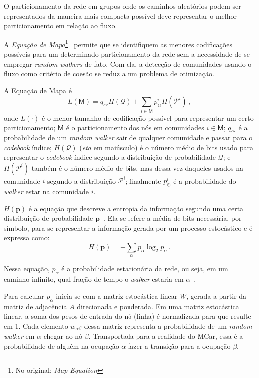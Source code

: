 \documentclass[12pt,a4paper]{article}
\begin{document}
O particionamento da rede em grupos onde os caminhos aleatórios podem ser representados da maneira mais compacta possível deve representar o melhor particionamento em relação ao fluxo.

A \textit{Equação de Mapa}\footnote{No original: \textit{Map Equation}}~\cite{Rosvall2009-sd} permite que se identifiquem as menores codificações possíveis para um determinado particionamento da rede sem a necessidade de se empregar \textit{random walkers} de fato. Com ela, a detecção de comunidades usando o fluxo como critério de coesão se reduz a um problema de otimização.

A Equação de Mapa é
\begin{equation} \label{eq:map-equation}
L(\mathsf{M}) = q_\curvearrowright H(\mathcal{Q}) + \sum_{i \in \mathsf{M}} p^i_\circlearrowright H(\mathcal{P}^i)\,,
\end{equation}
onde $L(\cdot)$ é o menor tamanho de codificação possível para representar um certo particionamento; $\mathsf{M}$ é o particionamento dos nós em comunidades $i \in \mathsf{M}$; $q_\curvearrowright$ é a probabilidade de um \textit{random walker} sair de qualquer comunidade e passar para o \textit{codebook} índice; $H(\mathcal{Q})$ (\textit{eta} em maiúsculo) é o número médio de bits usado para representar o \textit{codebook} índice segundo a distribuição de probabilidade $\mathcal{Q}$; e $H(\mathcal{P}^i)$ também é o número médio de bits, mas dessa vez daqueles usados na comunidade $i$ segundo a distribuição $\mathcal{P}^i$; finalmente $p^i_\circlearrowright$ é a probabilidade do \textit{walker} estar na comunidade $i$.

$H(\textbf{p})$ é a equação que descreve a entropia da informação segundo uma certa distribuição de probabilidade $\textbf{p}$~\cite{Shannon1948-ic}. Ela se refere a média de bits necessária, por símbolo, para se representar a informação gerada por um processo estocástico e é expressa como:
\begin{equation*}
H(\textbf{p}) = - \sum_\alpha p_\alpha \log_2 p_\alpha\,.
\end{equation*}

Nessa equação, $p_\alpha$ é a probabilidade estacionária da rede, ou seja, em um caminho infinito, qual fração de tempo o \textit{walker} estaria em $\alpha$~\cite{Rosvall2009-sd}.

Para calcular $p_\alpha$ inicia-se com a matriz estocástica linear $W$, gerada a partir da matriz de adjacência $A$ direcionada e ponderada. Em uma matriz estocástica linear, a soma dos pesos de entrada do nó (linha) é normalizada para que resulte em 1. Cada elemento $w_{\alpha \beta}$ dessa matriz representa a probabilidade de um \textit{random walker}  em $\alpha$ chegar ao nó $\beta$. Transportada para a realidade do MCar, essa é a probabilidade de alguém na ocupação $\alpha$ fazer a transição para a ocupação $\beta$.
\end{document}

